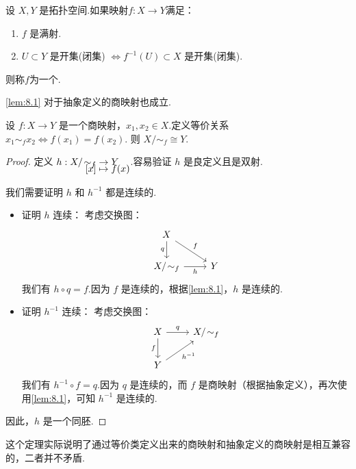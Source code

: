 \begin{definition}[商映射的抽象定义][def:8.2]
    设 $X, Y$ 是拓扑空间.如果映射$f: X \to Y$满足：
    \begin{enumerate}[(1)]
        \item $f$ 是满射.
        \item $U \subset Y$ 是开集(闭集) $\iff f^{-1}(U) \subset X$ 是开集(闭集).
    \end{enumerate}
    则称$f$为一个.
\end{definition}

\begin{remark}
    \cref{lem:8.1} 对于抽象定义的商映射也成立.
\end{remark}

\begin{theorem}[商空间同胚定理][thm:8.1]
    设 $f: X \to Y$ 是一个商映射，$x_1, x_2 \in X$.定义等价关系 $x_1 \sim_f x_2 \iff f(x_1) = f(x_2)$.
    则 $X/\!\sim_f \cong Y$.
\end{theorem}
\begin{proof}
    定义 $\setjot[-5]\begin{aligned}[t]
        h: X/\!\sim_f&\to Y \\
        [x]&\mapsto f(x)
    \end{aligned} $.容易验证 $h$ 是良定义且是双射.\par
    我们需要证明 $h$ 和 $h^{-1}$ 都是连续的.
    \begin{itemize}
        \item 证明 $h$ 连续：
        考虑交换图：
        \[
        \begin{tikzcd}
            X \arrow[rd, "f"] \arrow[d, "q"'] & \\
            X/\!\sim_f \arrow[r, "h"'] & Y
        \end{tikzcd}
        \]
        我们有 $h \circ q = f$.因为 $f$ 是连续的，根据\cref{lem:8.1}，$h$ 是连续的.

        \item 证明 $h^{-1}$ 连续：
        考虑交换图：
        \[
        \begin{tikzcd}
            X \arrow[d, "f"'] \arrow[r, "q"] & X/\!\sim_f \\
            Y \arrow[ru, "h^{-1}"'] &
        \end{tikzcd}
        \]
        我们有 $h^{-1} \circ f = q$.因为 $q$ 是连续的，而 $f$ 是商映射（根据抽象定义），再次使用\cref{lem:8.1}，可知 $h^{-1}$ 是连续的.
    \end{itemize}
    因此，$h$ 是一个同胚.
\end{proof}
这个定理实际说明了通过等价类定义出来的商映射和抽象定义的商映射是相互兼容的，二者并不矛盾.

